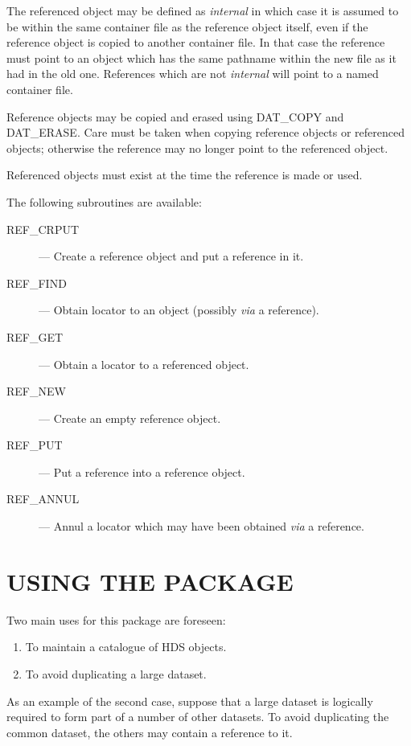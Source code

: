 The referenced object may be defined as {\em internal\/} in which case it is
assumed to be within the same container file as the reference object itself,
even if the reference object is copied to another container file.
In that case the reference must point to an object which has the same pathname
within the new file as it had in the old one.
References which are not {\em internal\/} will point to a named container file.

Reference objects may be copied and erased using DAT\_COPY and DAT\_ERASE\@.
Care must be taken when copying reference objects or referenced objects;
otherwise the reference may no longer point to the referenced object.

Referenced objects must exist at the time the reference is made or used.

The following subroutines are available:
\begin{description}
\begin{description}
\item [REF\_CRPUT] --- Create a reference object and put a reference in it.
\item [REF\_FIND] --- Obtain locator to an object (possibly {\em via} a
reference).
\item [REF\_GET] --- Obtain a locator to a referenced object.
\item [REF\_NEW] --- Create an empty reference object.
\item [REF\_PUT] --- Put a reference into a reference object.
\item [REF\_ANNUL] --- Annul a locator which may have been obtained {\em via} a 
reference.
\end{description}
\end{description}

\section{USING THE PACKAGE}

Two main uses for this package are foreseen:
\begin{enumerate}
\item To maintain a catalogue of HDS objects.
\item To avoid duplicating a large dataset.
\end{enumerate}
As an example of the second case, suppose that a large dataset is logically
required to form part of a number of other datasets.
To avoid duplicating the common dataset, the others may contain a reference to
it.


